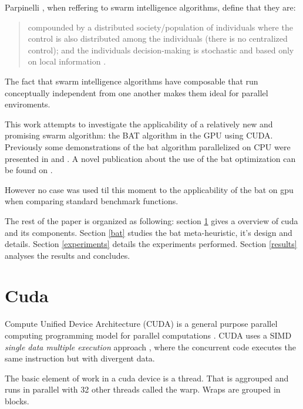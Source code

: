 \documentclass[conference]{IEEEtran}
\begin{document}
Parpinelli \cite{newInspirations}, when reffering to swarm
intelligence algorithms, define that they are: \begin{quote} compounded by a distributed
society/population of individuals where the control is also
distributed among the individuals (there is no centralized control);
and the individuals decision-making is stochastic and based only on
local information .\end{quote}

The fact that swarm intelligence algorithms have composable that run
conceptually independent from one another makes them ideal for parallel
enviroments.

This work attempts to investigate the applicability of a relatively new
and promising swarm algorithm: the BAT algorithm in the GPU using CUDA.
Previously some demonstrations of the bat algorithm parallelized on CPU
were presented in \cite{paralellCPUFirst} and \cite{paralellCPU}. A
novel publication about the use of the bat optimization can be found on
\cite{firstBatGPU}.

However no case was used til this moment to the applicability of the bat on gpu when comparing standard benchmark functions.

The rest of the paper is organized as following: section \ref{cuda}
gives a overview of cuda and its components. Section \ref{bat}
studies the bat meta-heuristic, it's design and details. Section
\ref{experiments} details the experiments performed. Section
\ref{results} analyses the results and concludes.


\section{Cuda} \label{cuda}%

Compute Unified Device Architecture (CUDA) is a general purpose
parallel computing programming model for parallel computations \cite{cudaDefinition}. CUDA
uses a SIMD \textit{single data multiple execution} approach \cite{gpuOptimization}, where the
concurrent code executes the same instruction but with divergent data.


The basic element of work in a cuda device is a thread. That is aggrouped and 
runs in parallel with 32 other threads called the warp.
Wraps are grouped in blocks.
\end{document}

